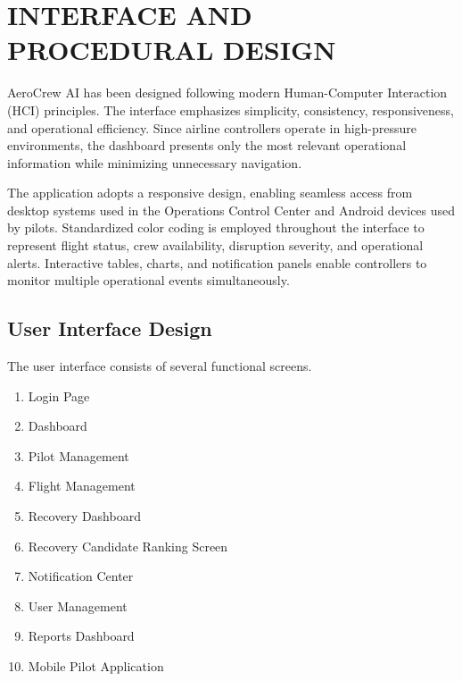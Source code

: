 \documentclass[12pt,a4paper]{report}
\begin{document}
\section{INTERFACE AND PROCEDURAL DESIGN}

AeroCrew AI has been designed following modern Human-Computer Interaction (HCI) principles. The interface emphasizes simplicity, consistency, responsiveness, and operational efficiency. Since airline controllers operate in high-pressure environments, the dashboard presents only the most relevant operational information while minimizing unnecessary navigation.

The application adopts a responsive design, enabling seamless access from desktop systems used in the Operations Control Center and Android devices used by pilots. Standardized color coding is employed throughout the interface to represent flight status, crew availability, disruption severity, and operational alerts. Interactive tables, charts, and notification panels enable controllers to monitor multiple operational events simultaneously.

\subsection{User Interface Design}

The user interface consists of several functional screens.

\begin{enumerate}

\item Login Page

\item Dashboard

\item Pilot Management

\item Flight Management

\item Recovery Dashboard

\item Recovery Candidate Ranking Screen

\item Notification Center

\item User Management

\item Reports Dashboard

\item Mobile Pilot Application

\end{enumerate}
\end{document}

